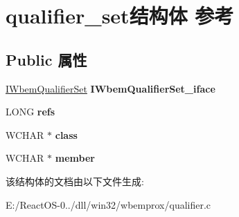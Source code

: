 \hypertarget{structqualifier__set}{}\section{qualifier\+\_\+set结构体 参考}
\label{structqualifier__set}
\subsection*{Public 属性}
\begin{DoxyCompactItemize}
\item 
\mbox{\label{structqualifier__set_ab7bce5e504322e4fc61284e0a684f4d3}} 
\hyperlink{interface_i_wbem_qualifier_set}{I\+Wbem\+Qualifier\+Set} {\bfseries I\+Wbem\+Qualifier\+Set\+\_\+iface}
\item 
\mbox{\label{structqualifier__set_a39124a30d2bac3e79028ea6718042603}} 
L\+O\+NG {\bfseries refs}
\item 
\mbox{\label{structqualifier__set_a3efc0eb4c640211fe16b1baa8f8a773f}} 
W\+C\+H\+AR $\ast$ {\bfseries class}
\item 
\mbox{\label{structqualifier__set_aed2ff85a4405b4b7e4469ed7ef352f7f}} 
W\+C\+H\+AR $\ast$ {\bfseries member}
\end{DoxyCompactItemize}


该结构体的文档由以下文件生成\+:\begin{DoxyCompactItemize}
\item 
E\+:/\+React\+O\+S-\/0../dll/win32/wbemprox/qualifier.\+c\end{DoxyCompactItemize}
